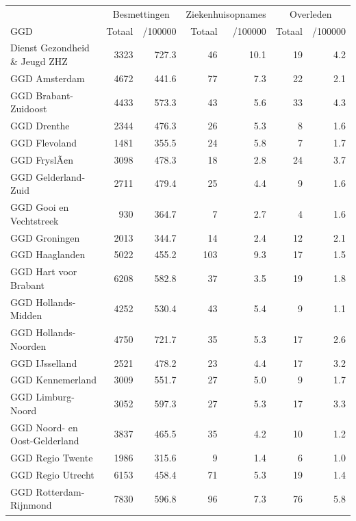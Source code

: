 \documentclass[
  english,
  man,floatsintext]{apa6}
\begin{document}
\begin{table}
\centering\begingroup\fontsize{10}{12}\selectfont

\begin{threeparttable}
\begin{tabular}{lrrrrrr}
\toprule
\multicolumn{1}{c}{ } & \multicolumn{2}{c}{Besmettingen} & \multicolumn{2}{c}{Ziekenhuisopnames} & \multicolumn{2}{c}{Overleden} \\
\cmidrule(l{3pt}r{3pt}){2-3} \cmidrule(l{3pt}r{3pt}){4-5} \cmidrule(l{3pt}r{3pt}){6-7}
GGD & Totaal & /100000 & Totaal & /100000 & Totaal & /100000\\
\midrule
Dienst Gezondheid \& Jeugd ZHZ & 3323 & 727.3 & 46 & 10.1 & 19 & 4.2\\
GGD Amsterdam & 4672 & 441.6 & 77 & 7.3 & 22 & 2.1\\
GGD Brabant-Zuidoost & 4433 & 573.3 & 43 & 5.6 & 33 & 4.3\\
GGD Drenthe & 2344 & 476.3 & 26 & 5.3 & 8 & 1.6\\
GGD Flevoland & 1481 & 355.5 & 24 & 5.8 & 7 & 1.7\\
GGD FryslÃ¢n & 3098 & 478.3 & 18 & 2.8 & 24 & 3.7\\
GGD Gelderland-Zuid & 2711 & 479.4 & 25 & 4.4 & 9 & 1.6\\
GGD Gooi en Vechtstreek & 930 & 364.7 & 7 & 2.7 & 4 & 1.6\\
GGD Groningen & 2013 & 344.7 & 14 & 2.4 & 12 & 2.1\\
GGD Haaglanden & 5022 & 455.2 & 103 & 9.3 & 17 & 1.5\\
GGD Hart voor Brabant & 6208 & 582.8 & 37 & 3.5 & 19 & 1.8\\
GGD Hollands-Midden & 4252 & 530.4 & 43 & 5.4 & 9 & 1.1\\
GGD Hollands-Noorden & 4750 & 721.7 & 35 & 5.3 & 17 & 2.6\\
GGD IJsselland & 2521 & 478.2 & 23 & 4.4 & 17 & 3.2\\
GGD Kennemerland & 3009 & 551.7 & 27 & 5.0 & 9 & 1.7\\
GGD Limburg-Noord & 3052 & 597.3 & 27 & 5.3 & 17 & 3.3\\
GGD Noord- en Oost-Gelderland & 3837 & 465.5 & 35 & 4.2 & 10 & 1.2\\
GGD Regio Twente & 1986 & 315.6 & 9 & 1.4 & 6 & 1.0\\
GGD Regio Utrecht & 6153 & 458.4 & 71 & 5.3 & 19 & 1.4\\
GGD Rotterdam-Rijnmond & 7830 & 596.8 & 96 & 7.3 & 76 & 5.8\\

\end{tabular}
\end{threeparttable}
\end{table}
\end{document}
